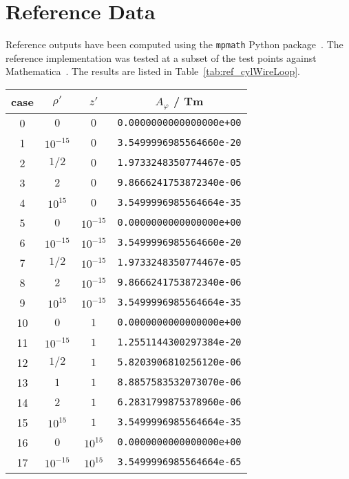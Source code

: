 \section{Reference Data}
\label{appx:reference_data}
Reference outputs have been computed using the \texttt{mpmath} Python package~\cite{mpmath}.
The reference implementation was tested at a subset of the test points against Mathematica~\cite{Mathematica}.
The results are listed in Table~\ref{tab:ref_cylWireLoop}.
\begin{table}[htbp]
  \centering
  \begin{tabular}{c|c|c|c}
    case & $\rho'$ & $z'$ & $A_\varphi$ / Tm \\
    \hline
     0 & $0$        & $0$        & \texttt{0.0000000000000000e+00} \\
     1 & $10^{-15}$ & $0$        & \texttt{3.5499996985564660e-20} \\
     2 & $1/2$      & $0$        & \texttt{1.9733248350774467e-05} \\
     3 & $2$        & $0$        & \texttt{9.8666241753872340e-06} \\
     4 & $10^{15}$  & $0$        & \texttt{3.5499996985564664e-35} \\
     5 & $0$        & $10^{-15}$ & \texttt{0.0000000000000000e+00} \\
     6 & $10^{-15}$ & $10^{-15}$ & \texttt{3.5499996985564660e-20} \\
     7 & $1/2$      & $10^{-15}$ & \texttt{1.9733248350774467e-05} \\
     8 & $2$        & $10^{-15}$ & \texttt{9.8666241753872340e-06} \\
     9 & $10^{15}$  & $10^{-15}$ & \texttt{3.5499996985564664e-35} \\
    10 & $0$        & $1$        & \texttt{0.0000000000000000e+00} \\
    11 & $10^{-15}$ & $1$        & \texttt{1.2551144300297384e-20} \\
    12 & $1/2$      & $1$        & \texttt{5.8203906810256120e-06} \\
    13 & $1$        & $1$        & \texttt{8.8857583532073070e-06} \\
    14 & $2$        & $1$        & \texttt{6.2831799875378960e-06} \\
    15 & $10^{15}$  & $1$        & \texttt{3.5499996985564664e-35} \\
    16 & $0$        & $10^{15}$  & \texttt{0.0000000000000000e+00} \\
    17 & $10^{-15}$ & $10^{15}$  & \texttt{3.5499996985564664e-65} \\

\end{tabular}
\end{table}
